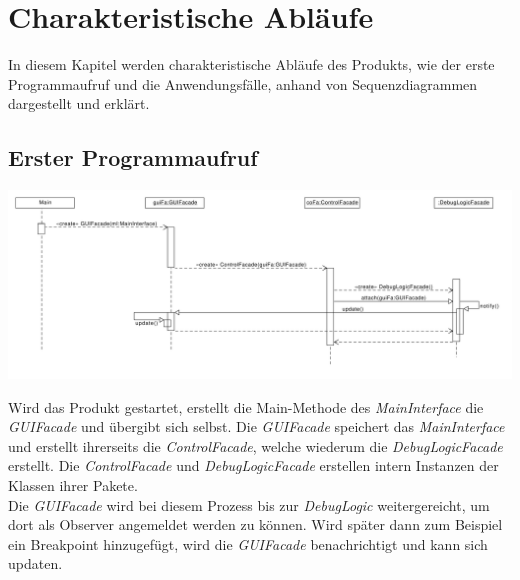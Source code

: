 \documentclass[parskip=full]{scrartcl}
\begin{document}
\newpage
\section{Charakteristische Abläufe}\label{charAbl}
In diesem Kapitel werden charakteristische Abläufe des Produkts, wie der erste Programmaufruf und die
Anwendungsfälle, anhand von Sequenzdiagrammen dargestellt und erklärt.

\subsection{Erster Programmaufruf}
\begin{center}
\includegraphics[width=1.0\textwidth]{diagrammIdeenUmlet/SequenceDiagrams/seq_firstCallPDF.pdf}
\end{center}
Wird das Produkt gestartet, erstellt die Main-Methode des \textit{MainInterface} die \textit{GUIFacade} und übergibt sich selbst.
Die \textit{GUIFacade} speichert das \textit{MainInterface} und erstellt ihrerseits die \textit{ControlFacade}, welche wiederum die \textit{DebugLogicFacade} erstellt.
Die \textit{ControlFacade} und \textit{DebugLogicFacade} erstellen intern Instanzen der Klassen ihrer Pakete. \\
Die \textit{GUIFacade} wird bei diesem Prozess bis zur \textit{DebugLogic} weitergereicht, um dort als Observer angemeldet werden zu können. 
Wird später dann zum Beispiel ein Breakpoint hinzugefügt, wird die \textit{GUIFacade} benachrichtigt und kann sich updaten.

\newpage
\end{document}
